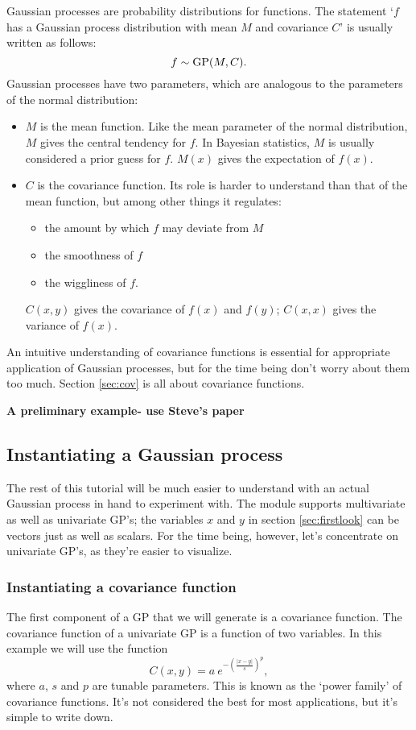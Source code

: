 \documentclass{manual}
\begin{document}
Gaussian processes are probability distributions for functions. The statement `$f$ has a Gaussian process distribution with mean $M$ and covariance $C$' is usually written as follows:
\begin{equation}
    f\sim\textup{GP}(M,C).
\end{equation}
Gaussian processes have two parameters, which are analogous to the parameters of the normal distribution:
\begin{itemize}
    \item $M$ is the mean function. Like the mean parameter of the normal distribution, $M$ gives the central tendency for $f$. In Bayesian statistics, $M$ is usually considered a prior guess for $f$. $M(x)$ gives the expectation of $f(x)$.
    \item $C$  is the covariance function. Its role is harder to understand than that of the mean function, but among other things it regulates:
    \begin{itemize}
        \item the amount by which $f$ may deviate from $M$
        \item the smoothness of $f$
        \item the wiggliness of $f$.
    \end{itemize}
    $C(x,y)$ gives the covariance of $f(x)$ and $f(y)$; $C(x,x)$ gives the variance of $f(x)$.
\end{itemize}
An intuitive understanding of covariance functions is essential for appropriate application of Gaussian processes, but for the time being don't worry about them too much. Section \ref{sec:cov} is all about covariance functions.

\textbf{A preliminary example- use Steve's paper}

\subsection{Instantiating a Gaussian process}\label{sub:inst}

The rest of this tutorial will be much easier to understand with an actual Gaussian process in hand to experiment with. The  module supports multivariate as well as univariate GP's; the variables $x$ and $y$ in section \ref{sec:firstlook} can be vectors just as well as scalars. For the time being, however, let's concentrate on univariate GP's, as they're easier to visualize.

\subsubsection{Instantiating a covariance function}\label{subsub:cov}
The first component of a GP that we will generate is a covariance function. The covariance function of a univariate GP is a function of two variables. In this example we will use the function 
\begin{equation}
	C(x,y) = a\ e^{-\left(\frac{|x-y|} {s}\right) ^ p},
\end{equation}
where $a$, $s$ and $p$ are tunable parameters. This is known as the `power family' of covariance functions. It's not considered the best for most applications, but it's simple to write down.
\end{document}
